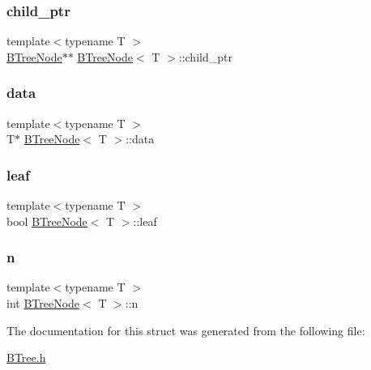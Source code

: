 \subsubsection{\texorpdfstring{child\+\_\+ptr}{child\_ptr}}
{\footnotesize\ttfamily template$<$typename T $>$ \\
\hyperlink{structBTreeNode}{B\+Tree\+Node}$\ast$$\ast$ \hyperlink{structBTreeNode}{B\+Tree\+Node}$<$ T $>$\+::child\+\_\+ptr}

\mbox{\label{structBTreeNode_af877c66e47b110ed0f05e95351003531}} 
\subsubsection{\texorpdfstring{data}{data}}
{\footnotesize\ttfamily template$<$typename T $>$ \\
T$\ast$ \hyperlink{structBTreeNode}{B\+Tree\+Node}$<$ T $>$\+::data}

\mbox{\label{structBTreeNode_a8350f9ddcf6e2323413d9d061c382ea6}} 
\subsubsection{\texorpdfstring{leaf}{leaf}}
{\footnotesize\ttfamily template$<$typename T $>$ \\
bool \hyperlink{structBTreeNode}{B\+Tree\+Node}$<$ T $>$\+::leaf}

\mbox{\label{structBTreeNode_ac6993709a99bec1116e1c6dccc3c0f8a}} 
\subsubsection{\texorpdfstring{n}{n}}
{\footnotesize\ttfamily template$<$typename T $>$ \\
int \hyperlink{structBTreeNode}{B\+Tree\+Node}$<$ T $>$\+::n}



The documentation for this struct was generated from the following file\+:\begin{DoxyCompactItemize}
\item 
\hyperlink{BTree_8h}{B\+Tree.\+h}\end{DoxyCompactItemize}
